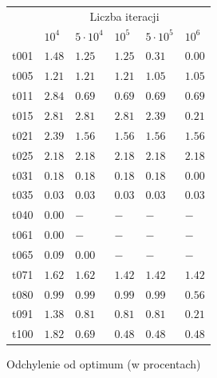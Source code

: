 \documentclass[12pt]{article}
\begin{document}
\begin{figure}
  \centering
    \begin{tabular}{l|l|l|l|l|l|} \cline{2-6}
     & \multicolumn{5}{|c|}{Liczba iteracji} \\ \cline{2-6}
                                & $10^4$  & $5\cdot 10^4$ & $10^5$ & $5\cdot 10^5$ & $10^6$ \\ \hline
    \multicolumn{1}{|c|}{t001} 	& $1.48$  & $1.25$        & $1.25$ & $0.31$        & $0.00$ \\ \hline
    \multicolumn{1}{|c|}{t005} 	& $1.21$  & $1.21$        & $1.21$ & $1.05$        & $1.05$ \\ \hline
    \multicolumn{1}{|c|}{t011} 	& $2.84$  & $0.69$        & $0.69$ & $0.69$        & $0.69$ \\ \hline
    \multicolumn{1}{|c|}{t015} 	& $2.81$  & $2.81$        & $2.81$ & $2.39$        & $0.21$ \\ \hline
    \multicolumn{1}{|c|}{t021} 	& $2.39$  & $1.56$        & $1.56$ & $1.56$        & $1.56$ \\ \hline
    \multicolumn{1}{|c|}{t025} 	& $2.18$  & $2.18$        & $2.18$ & $2.18$        & $2.18$ \\ \hline
    \multicolumn{1}{|c|}{t031} 	& $0.18$  & $0.18$        & $0.18$ & $0.18$        & $0.00$ \\ \hline
    \multicolumn{1}{|c|}{t035} 	& $0.03$  & $0.03$        & $0.03$ & $0.03$        & $0.03$ \\ \hline
    \multicolumn{1}{|c|}{t040} 	& $0.00$  & $-$           & $-$    & $-$           & $-$    \\ \hline
    \multicolumn{1}{|c|}{t061} 	& $0.00$  & $-$           & $-$    & $-$           & $-$    \\ \hline
    \multicolumn{1}{|c|}{t065} 	& $0.09$  & $0.00$        & $-$    & $-$           & $-$    \\ \hline
    \multicolumn{1}{|c|}{t071} 	& $1.62$  & $1.62$        & $1.42$ & $1.42$        & $1.42$ \\ \hline
    \multicolumn{1}{|c|}{t080} 	& $0.99$  & $0.99$        & $0.99$ & $0.99$        & $0.56$ \\ \hline
    \multicolumn{1}{|c|}{t091} 	& $1.38$  & $0.81$        & $0.81$ & $0.81$        & $0.21$ \\ \hline  
    \multicolumn{1}{|c|}{t100} 	& $1.82$  & $0.69$        & $0.48$ & $0.48$        & $0.48$ \\ \hline
    \end{tabular}
  \caption{Odchylenie od optimum (w procentach)}
  \label{tab:extreme}
\end{figure}
\end{document}
